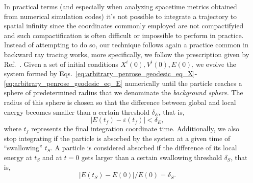 In practical terms (and especially when analyzing spacetime metrics obtained from numerical simulation codes) it's not possible to integrate a trajectory to spatial infinity since the coordinates commonly employed are not compactifyied and such compactification is often difficult or impossible to perform in practice. Instead of attempting to do so, our technique follows again a practice common in backward ray tracing works, more specifically, we follow the prescription given by Ref.~\cite{Bohn:2014xxa}. Given a set of initial conditions $X^i(0), V^i(0), E(0)$, we evolve the system formed by Eqs.~\eqref{eq:arbitrary_penrose_geodesic_eq_X}-\eqref{eq:arbitrary_penrose_geodesic_eq_E} numerically until the particle reaches a sphere of predetermined radius that we denominate the \emph{background sphere}. The radius of this sphere is chosen so that the difference between global and local energy becomes smaller than a certain threshold $\delta_E$, that is, 
%
\begin{equation}
  |E(t_f)- \varepsilon(t_f)| < \delta_E,
  \label{eq:arbitrary_penrose_background_sphere_cplision_condition}
\end{equation}
%
where $t_f$ represents the final integration coordinate time. Additionally, we also stop integrating if the particle is absorbed by the system at a given time of ``swallowing'' $t_S$. A particle is considered absorbed if the difference of its local energy at $t_S$ and at $t=0$ gets larger than a certain swallowing threshold $\delta_S$, that is, 
%
\begin{equation}
  |E(t_S) - E(0)|/E(0) = \delta_S.
  \label{eq:arbitrary_penrose_swallowing_condition}
\end{equation}

